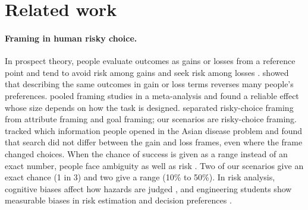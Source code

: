 \documentclass[11pt]{article}
\begin{document}
\section{Related work}

\paragraph{Framing in human risky choice.} In prospect theory, people evaluate outcomes as gains or losses from a reference point and tend to avoid risk among gains and seek risk among losses \citep{kahneman1979prospect}. \citet{tversky1981framing} showed that describing the same outcomes in gain or loss terms reverses many people's preferences. \citet{kuhberger1998influence} pooled framing studies in a meta-analysis and found a reliable effect whose size depends on how the task is designed. \citet{levin1998all} separated risky-choice framing from attribute framing and goal framing; our scenarios are risky-choice framing. \citet{schultemecklenbeck2014out} tracked which information people opened in the Asian disease problem and found that search did not differ between the gain and loss frames, even where the frame changed choices. When the chance of success is given as a range instead of an exact number, people face ambiguity as well as risk \citep{ellsberg1961risk}. Two of our scenarios give an exact chance (1 in 3) and two give a range (10\% to 50\%). In risk analysis, cognitive biases affect how hazards are judged \citep{montibeller2015cognitive}, and engineering students show measurable biases in risk estimation and decision preferences \citep{gernand2023set}.
\end{document}
